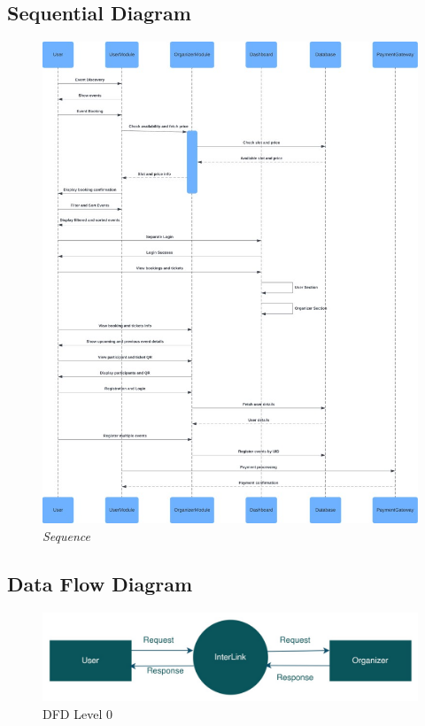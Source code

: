 \documentclass[twoside,a4paper,openright]{report} %
\begin{document}
\subsection{Sequential Diagram}
\begin{figure}[H]
	\centering
	\includegraphics[scale=0.35]{sequence.jpg}  
	\caption{\textit{Sequence}}
	\label{fig:sequential-diagram}
\end{figure}

\subsection{Data Flow Diagram}
\begin{figure}[H]
	\centering
	\includegraphics[width=\textwidth]{dfd1.jpg}
	\caption{DFD Level 0}
	\label{fig:dfd0}
\end{figure}
\end{document}
